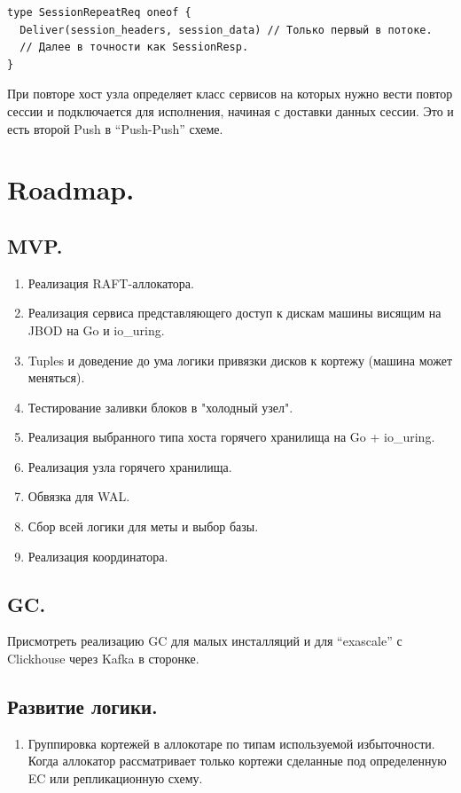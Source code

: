 \documentclass[a4paper,12pt]{article}
\begin{document}
    \begin{lstlisting}
type SessionRepeatReq oneof {
  Deliver(session_headers, session_data) // Только первый в потоке.
  // Далее в точности как SessionResp.
}
    \end{lstlisting}

    При повторе хост узла определяет класс сервисов на которых нужно вести повтор сессии и подключается для исполнения,
    начиная с доставки данных сессии. Это и есть второй Push в \enquote{Push-Push} схеме.

    \newpage


    \section{Roadmap.}

    \subsection{MVP.}

    \begin{enumerate}
        \item Реализация RAFT-аллокатора.
        \item Реализация сервиса представляющего доступ к дискам машины висящим на JBOD на Go и io\_uring.
        \item Tuples и доведение до ума логики привязки дисков к кортежу (машина может меняться).
        \item Тестирование заливки блоков в "холодный узел".
        \item Реализация выбранного типа хоста горячего хранилища на Go + io\_uring.
        \item Реализация узла горячего хранилища.
        \item Обвязка для WAL.
        \item Сбор всей логики для меты и выбор базы.
        \item Реализация координатора.
    \end{enumerate}

    \subsection{GC.}

    Присмотреть реализацию GC для малых инсталляций и для \enquote{exascale} с Clickhouse через Kafka в сторонке.

    \subsection{Развитие логики.}
    \begin{enumerate}
        \item Группировка кортежей в аллокотаре по типам используемой избыточности. Когда аллокатор рассматривает только
        кортежи сделанные под определенную EC или репликационную схему.
    \end{enumerate}
\end{document}
